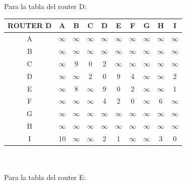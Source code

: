 \documentclass{article}
\begin{document}
\\\\
Para la tabla del router D:\\
\begin{tabular}{ | c | c | c | c | c | c | c | c | c | c |}
\hline                 
ROUTER D    & A      & B      & C      & D      & E      & F      & G      & H      & I      \\
\hline
        A   &$\infty$&$\infty$&$\infty$&$\infty$&$\infty$&$\infty$&$\infty$&$\infty$&$\infty$\\
\hline
        B   &$\infty$&$\infty$&$\infty$&$\infty$&$\infty$&$\infty$&$\infty$&$\infty$&$\infty$\\
\hline
        C   &$\infty$& 9      & 0      & 2      &$\infty$&$\infty$&$\infty$&$\infty$&$\infty$\\
\hline
        D   &$\infty$&$\infty$& 2      & 0      & 9      & 4      &$\infty$&$\infty$& 2      \\
\hline
        E   &$\infty$& 8      &$\infty$& 9      & 0      & 2      &$\infty$&$\infty$& 1      \\
\hline
        F   &$\infty$&$\infty$&$\infty$& 4      & 2      & 0      &$\infty$& 6      &$\infty$\\
\hline
        G   &$\infty$&$\infty$&$\infty$&$\infty$&$\infty$&$\infty$&$\infty$&$\infty$&$\infty$\\
\hline
        H   &$\infty$&$\infty$&$\infty$&$\infty$&$\infty$&$\infty$&$\infty$&$\infty$&$\infty$\\
\hline 
        I   & 10     &$\infty$&$\infty$& 2      & 1      &$\infty$&$\infty$& 3      & 0      \\
\hline
\end{tabular}
\\\\
Para la tabla del router E:\\
\end{document}
